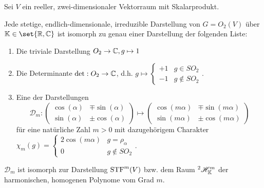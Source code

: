 \begin{theorem}\label{darstellungen:o2}
Sei $V$ ein reeller, zwei-dimensionaler Vektorraum mit Skalarprodukt.

Jede stetige, endlich-dimensionale, irreduzible Darstellung von $G=O_2(V)$ über $\IK\in\set{\IR,\IC}$ ist isomorph zu genau einer Darstellung der folgenden Liste:
\begin{enumerate}
\item Die triviale Darstellung $O_2\to\mathbb{C}, g\mapsto 1$
\item Die Determinante $\det: O_2\to\mathbb{C}$, d.h. $g\mapsto\begin{cases}+1&g\in SO_2 \\ -1&g\notin SO_2\end{cases}$.
\item Eine der Darstellungen
\[\mathcal{D}_m : \begin{pmatrix}\cos(\alpha)&\mp\sin(\alpha)\\\sin(\alpha)&\pm\cos(\alpha)\end{pmatrix} \mapsto \begin{pmatrix}\cos(m\alpha)&\mp\sin(m\alpha)\\\sin(m\alpha)&\pm\cos(m\alpha)\end{pmatrix}\]
für eine natürliche Zahl $m>0$ mit dazugehörigem Charakter $\chi_m(g) = \begin{cases} 2\cos(m\alpha) & g=\rho_\alpha \\ 0 & g\notin SO_2\end{cases}$.
\end{enumerate}
$\mathcal{D}_m$ ist isomorph zur Darstellung $\operatorname{STF}^m(V)$ bzw. dem Raum ${^2} \mathscr{H}_{\mathbb{K}}^m$ der harmonischen, homogenen Polynome vom Grad $m$.
\end{theorem}
